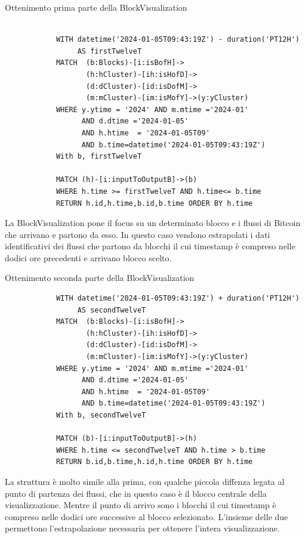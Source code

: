 \newpage \thispagestyle{mystyle}

\begin{center}
Ottenimento prima parte della BlockVisualization
\begin{lstlisting}

            WITH datetime('2024-01-05T09:43:19Z') - duration('PT12H') 
                 AS firstTwelveT
            MATCH  (b:Blocks)-[i:isBofH]->
                   (h:hCluster)-[ih:isHofD]->
                   (d:dCluster)-[id:isDofM]->
                   (m:mCluster)-[im:isMofY]->(y:yCluster)
            WHERE y.ytime = '2024' AND m.mtime ='2024-01'  
                  AND d.dtime ='2024-01-05' 
                  AND h.htime  = '2024-01-05T09' 
                  AND b.time=datetime('2024-01-05T09:43:19Z')
            With b, firstTwelveT
            
            MATCH (h)-[i:inputToOutputB]->(b)
            WHERE h.time >= firstTwelveT AND h.time<= b.time
            RETURN h.id,h.time,b.id,b.time ORDER BY h.time
\end{lstlisting} 
\end{center}
La BlockVisualization pone il focus su un determinato blocco e i flussi di Bitcoin che arrivano e partono da esso.
In questo caso vendono estrapolati i dati identificativi dei flussi che partono da blocchi il cui timestamp è compreso nelle dodici ore precedenti e arrivano blocco scelto.

\begin{center}
Ottenimento seconda parte della BlockVisualization
\begin{lstlisting}
            WITH datetime('2024-01-05T09:43:19Z') + duration('PT12H') 
                 AS secondTwelveT
            MATCH  (b:Blocks)-[i:isBofH]->
                   (h:hCluster)-[ih:isHofD]->
                   (d:dCluster)-[id:isDofM]->
                   (m:mCluster)-[im:isMofY]->(y:yCluster)
            WHERE y.ytime = '2024' AND m.mtime ='2024-01'  
                  AND d.dtime ='2024-01-05' 
                  AND h.htime  = '2024-01-05T09' 
                  AND b.time=datetime('2024-01-05T09:43:19Z')
            With b, secondTwelveT 
            
            MATCH (b)-[i:inputToOutputB]->(h) 
            WHERE h.time <= secondTwelveT AND h.time > b.time  
            RETURN b.id,b.time,h.id,h.time ORDER BY h.time
\end{lstlisting} 
\end{center}
\newpage \thispagestyle{mystyle}
La struttura è molto simile alla prima, con qualche piccola diffenza legata al punto di partenza dei flussi, che in questo caso è il blocco centrale della visualizzazione. Mentre il punto di arrivo sono i blocchi il cui timestamp è compreso nelle dodici ore successive al blocco selezionato.
L'insieme delle due permettono l'estrapolazione necessaria per ottenere l'intera visualizzazione.

